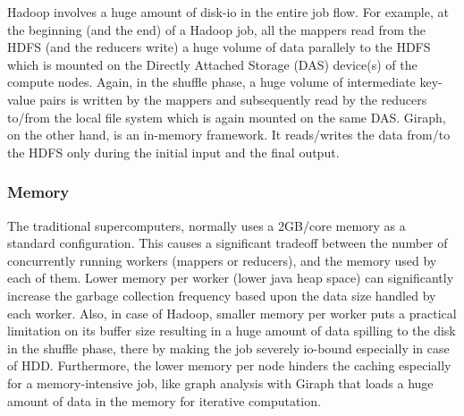 \documentclass[conference]{IEEEtran}
\begin{document}
Hadoop involves a huge amount of disk-io in the entire job flow. 
For example, at the beginning (and the end) of a Hadoop job, all the mappers read from the HDFS (and the reducers write) a huge volume of data parallely to the HDFS which is mounted on the Directly Attached Storage (DAS) device(s) of the compute nodes.
Again, in the shuffle phase, a huge volume of intermediate key-value pairs is written by the mappers and subsequently read by the reducers to/from the local file system which is again mounted on the same DAS.
Giraph, on the other hand, is an in-memory framework. It reads/writes the data from/to the HDFS only during the initial input and the final output. 

\subsubsection {Memory}
The traditional supercomputers, normally uses a 2GB/core memory as a   standard configuration. 
This causes a significant tradeoff between the number of concurrently running workers (mappers or reducers), and the memory used by each of them.
Lower memory per worker (lower java heap space) can significantly increase the garbage collection frequency based upon the data size handled by each worker.
Also, in case of Hadoop, smaller memory per worker puts a practical limitation on its buffer size resulting in a huge amount of data spilling to the disk in the shuffle phase, there by making the job severely io-bound especially in case of HDD. 
Furthermore, the lower memory per node hinders the caching especially for a memory-intensive job, like graph analysis with Giraph that loads a huge amount of data in the memory for iterative computation.
\end{document}
